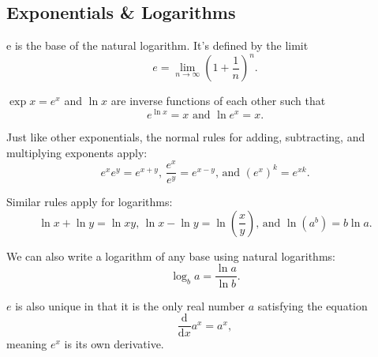\subsection{Exponentials \& Logarithms}
\begin{definition}
	e is the base of the natural logarithm. It's defined by the limit
	\begin{equation*}
		e = \lim\limits_{n\rightarrow\infty}{\left(1+\frac{1}{n}\right)^n}.
	\end{equation*}
\end{definition}
\noindent
$\exp{x} = e^x$ and $\ln{x}$ are inverse functions of each other such that
\begin{equation*}
	e^{\ln{x}} = x \text{ and } \ln{e^x} = x.
\end{equation*}

\noindent
Just like other exponentials, the normal rules for adding, subtracting, and multiplying exponents apply:
\begin{equation*}
	e^xe^y = e^{x+y} \text{, } \frac{e^x}{e^y}=e^{x-y} \text{, and } \left(e^x\right)^k=e^{xk}.
\end{equation*}

\noindent
Similar rules apply for logarithms:
\begin{equation*}
	\ln{x}+\ln{y} = \ln{xy} \text{, } \ln{x}-\ln{y} = \ln{\left(\frac{x}{y}\right)} \text{, and } \ln{\left(a^b\right)} = b\ln{a}.
\end{equation*}

\noindent
We can also write a logarithm of any base using natural logarithms:
\begin{equation*}
	\log_{b}{a} = \frac{\ln{a}}{\ln{b}}.
\end{equation*}

\noindent
$e$ is also unique in that it is the only real number $a$ satisfying the equation
\begin{equation*}
	\frac{\mathrm{d}}{\mathrm{d}x}a^x = a^x,
\end{equation*}
meaning $e^x$ is its own derivative.